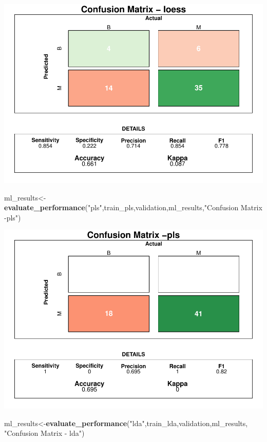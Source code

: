 \documentclass[]{article}
\newenvironment{Shaded}{\begin{snugshade}}{\end{snugshade}}
\newcommand{\KeywordTok}[1]{\textcolor[rgb]{0.13,0.29,0.53}{\textbf{#1}}}
\newcommand{\NormalTok}[1]{#1}
\newcommand{\StringTok}[1]{\textcolor[rgb]{0.31,0.60,0.02}{#1}}
\begin{document}
\includegraphics{LiverDisease_files/figure-latex/unnamed-chunk-41-1.pdf}

\begin{Shaded}
\begin{Highlighting}[]
\NormalTok{ml_results<-}\KeywordTok{evaluate_performance}\NormalTok{(}\StringTok{"pls"}\NormalTok{,train_pls,validation,ml_results,}\StringTok{"Confusion Matrix -pls"}\NormalTok{)}
\end{Highlighting}
\end{Shaded}

\includegraphics{LiverDisease_files/figure-latex/unnamed-chunk-42-1.pdf}

\begin{Shaded}
\begin{Highlighting}[]
\NormalTok{ml_results<-}\KeywordTok{evaluate_performance}\NormalTok{(}\StringTok{"lda"}\NormalTok{,train_lda,validation,ml_results, }\StringTok{"Confusion Matrix - lda"}\NormalTok{)}
\end{Highlighting}
\end{Shaded}
\end{document}
